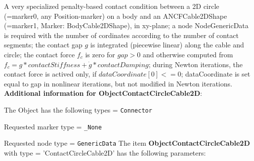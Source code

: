 \label{sec:item:ObjectContactCircleCable2D}
A very specialized penalty-based contact condition between a 2D circle (=marker0, any Position-marker) on a body and an ANCFCable2DShape (=marker1, Marker: BodyCable2DShape), in xy-plane; a node NodeGenericData is required with the number of cordinates according to the number of contact segments; the contact gap $g$ is integrated (piecewise linear) along the cable and circle; the contact force $f_c$ is zero for $gap>0$ and otherwise computed from $f_c = g*contactStiffness + \dot g*contactDamping$; during Newton iterations, the contact force is actived only, if $dataCoordinate[0] <= 0$; dataCoordinate is set equal to gap in nonlinear iterations, but not modified in Newton iterations.\vspace{12pt}
 \\{\bf Additional information for ObjectContactCircleCable2D}:
\bi
  \item The Object has the following types = \texttt{Connector}
  \item Requested marker type = \texttt{\_None}
  \item Requested node type = \texttt{GenericData}
\ei
\vspace{12pt} \noindent The item {\bf ObjectContactCircleCable2D} with type = 'ContactCircleCable2D' has the following parameters:\vspace{-1cm}\\ 
